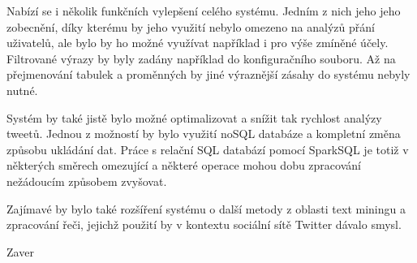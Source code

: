\documentclass[thesis=B,czech]{FITthesis}[2012/06/26]
\begin{document}
Nabízí se i několik funkčních vylepšení celého systému. Jedním z nich jeho jeho zobecnění, díky kterému by jeho využití nebylo omezeno na analýzů přání uživatelů, ale bylo by ho možné využívat například i pro výše zmíněné účely. Filtrované výrazy by byly zadány například do konfiguračního souboru. Až na přejmenování tabulek a proměnných by jiné výraznější zásahy do systému nebyly nutné. 

Systém by také jistě bylo možné optimalizovat a snížit tak rychlost analýzy tweetů. Jednou z možností by bylo využití noSQL databáze a kompletní změna způsobu ukládání dat. Práce s relační SQL databází pomocí SparkSQL je totiž v některých směrech omezující a některé operace mohou dobu zpracování nežádoucím způsobem zvyšovat. 

Zajímavé by bylo také rozšíření systému o další metody z oblasti text miningu a zpracování řeči, jejichž použití by v kontextu sociální sítě Twitter dávalo smysl. 

\begin{conclusion}
	Zaver
\end{conclusion}
\end{document}
